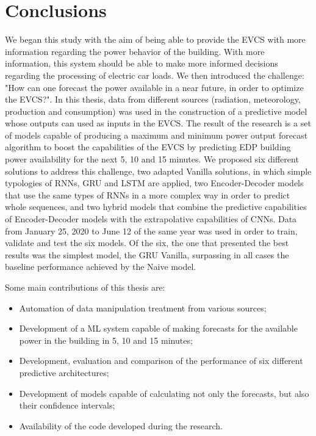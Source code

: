 \cleardoublepage
\label{chap:conclusion}

\section{Conclusions}

We began this study with the aim of being able to provide the \ac{EVCS} with more information regarding the power behavior of the building. With more information, this system should be able to make more informed decisions regarding the processing of electric car loads. We then introduced the challenge: "How can one forecast the power available in a near future, in order to optimize the \ac{EVCS}?". In this thesis, data from different sources (radiation, meteorology, production and consumption) was used in the construction of a predictive model whose outputs can used as inputs in the \ac{EVCS}. The result of the research is a set of models capable of producing a maximum and minimum power output forecast algorithm to boost the capabilities of the \ac{EVCS} by predicting \ac{EDP} building power availability for the next 5, 10 and 15 minutes. We proposed six different solutions to address this challenge, two adapted Vanilla solutions, in which simple typologies of \ac{RNN}s, \ac{GRU} and \ac{LSTM} are applied, two Encoder-Decoder models that use the same types of \ac{RNN}s in a more complex way in order to predict whole sequences, and two hybrid models that combine the predictive capabilities of Encoder-Decoder models with the extrapolative capabilities of \ac{CNN}s. Data from January 25, 2020 to June 12 of the same year was used in order to train, validate and test the six models. Of the six, the one that presented the best results was the simplest model, the \ac{GRU} Vanilla, surpassing in all cases the baseline performance achieved by the Naive model.

Some main contributions of this thesis are:
\begin{itemize}
\setlength\itemsep{0.1em}
    \item Automation of data manipulation treatment from various sources;
    \item Development of a \ac{ML} system capable of making forecasts for the available power in the building in 5, 10 and 15 minutes;
    \item Development, evaluation and comparison of the performance of six different predictive architectures;
    \item Development of models capable of calculating not only the forecasts, but also their confidence intervals;
    \item Availability of the code developed during the research.
    
\end{itemize}

